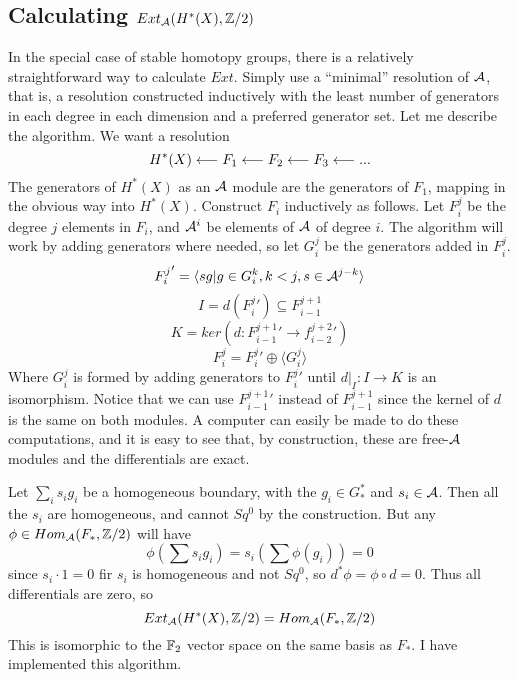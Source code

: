 \subsection{Calculating $Ext_{\mathcal{A}}(H^*(X),\mathbb{Z}/2)$}

In the special case of stable homotopy groups, there is a relatively straightforward way to calculate $Ext$.  
Simply use a ``minimal'' resolution of $\mathcal{A}$, that is, a resolution constructed inductively with the least number of generators in each degree in each dimension and a preferred generator set.  
Let me describe the algorithm.
We want a resolution
\[H^*(X)\longleftarrow F_1\longleftarrow F_2\longleftarrow F_3\longleftarrow ...\]
The generators of $H^*(X)$ as an $\mathcal{A}$ module are the generators of $F_1$, mapping in the obvious way into $H^*(X)$.  
Construct $F_i$ inductively as follows.  Let $F_i^j$ be the degree $j$ elements in $F_i$, and $\mathcal{A}^i$ be elements of $\mathcal{A}$ of degree $i$.  
The algorithm will work by adding generators where needed, so let $G_i^j$ be the generators added in $F_i^j$.  
\[{F_i^j}'=\langle sg|g\in G^k_i, k<j, s\in \mathcal{A}^{j-k} \rangle\]
\[I=d({F_i^j}')\subseteq F_{i-1}^{j+1}\]
\[K=ker(d:{F_{i-1}^{j+1}}'\to {f_{i-2}^{j+2}}')\]
\[F_i^j= {F_i^j}'\oplus \langle G_i^j\rangle\]
Where $G_i^j$ is formed by adding generators to ${F_i^j}'$ until $d|_I:I\to K$ is an isomorphism.
Notice that we can use ${F_{i-1}^{j+1}}'$ instead of $F_{i-1}^{j+1}$ since the kernel of $d$ is the same on both modules.  
A computer can easily be made to do these computations, and it is easy to see that, by construction, these are free-$\mathcal{A}$ modules and the differentials are exact.  

Let $\sum_i s_ig_i$ be a homogeneous boundary, with the $g_i\in G_*^*$ and $s_i\in \mathcal{A}$.  
Then all the $s_i$ are homogeneous, and cannot $Sq^0$ by the construction.  
But any $\phi\in Hom_{\mathcal{A}}(F_*,\mathbb{Z}/2)$ will have 
\[\phi(\sum s_ig_i)=s_i(\sum \phi(g_i))=0\]
since $s_i\cdot 1=0$ fir $s_i$ is homogeneous and not $Sq^0$, so $d^*\phi=\phi\circ d=0$.  
Thus all differentials are zero, so
\[Ext_{\mathcal{A}}(H^*(X),\mathbb{Z}/2)=Hom_{\mathcal{A}}(F_*,\mathbb{Z}/2)\]
This is isomorphic to the $\mathbb{F}_2$ vector space on the same basis as $F_*$.  
I have implemented this algorithm.  



